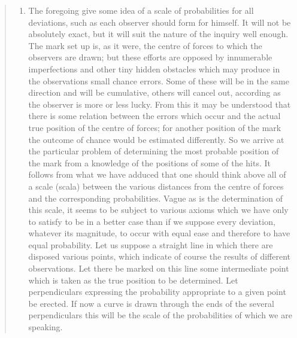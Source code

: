 \documentclass[]{book}
\providecommand{\tightlist}{%
  \setlength{\itemsep}{0pt}\setlength{\parskip}{0pt}}
\begin{document}
\begin{quote}
\begin{enumerate}
\def\labelenumi{\arabic{enumi}.}
\setcounter{enumi}{5}
\tightlist
\item
  The foregoing give some idea of a scale of probabilities for all deviations, such as each observer should form for himself. It will not be absolutely exact, but it will suit the nature of the inquiry well enough. The mark set up is, as it were, the centre of forces to which the observers are drawn; but these efforts are opposed by innumerable imperfections and other tiny hidden obstacles which may produce in the observations small chance errors. Some of these will be in the same direction and will be cumulative, others will cancel out, according as the observer is more or less lucky. From this it may be understood that there is some relation between the errors which occur and the actual true position of the centre of forces; for another position of the mark the outcome of chance would be estimated differently. So we arrive at the particular problem of determining the most probable position of the mark from a knowledge of the positions of some of the hits. It follows from what we have adduced that one should think above all of a scale (scala) between the various distances from the centre of forces and the corresponding probabilities. Vague as is the determination of this scale, it seems to be subject to various axioms which we have only to satisfy to be in a better case than if we suppose every deviation, whatever its magnitude, to occur with equal ease and therefore to have equal probability. Let us suppose a straight line in which there are disposed various points, which indicate of course the results of different observations. Let there be marked on this line some intermediate point which is taken as the true position to be determined. Let perpendiculars expressing the probability appropriate to a given point be erected. If now a curve is drawn through the ends of the several perpendiculars this will be the scale of the probabilities of which we are speaking.
\end{enumerate}
\end{quote}
\end{document}
